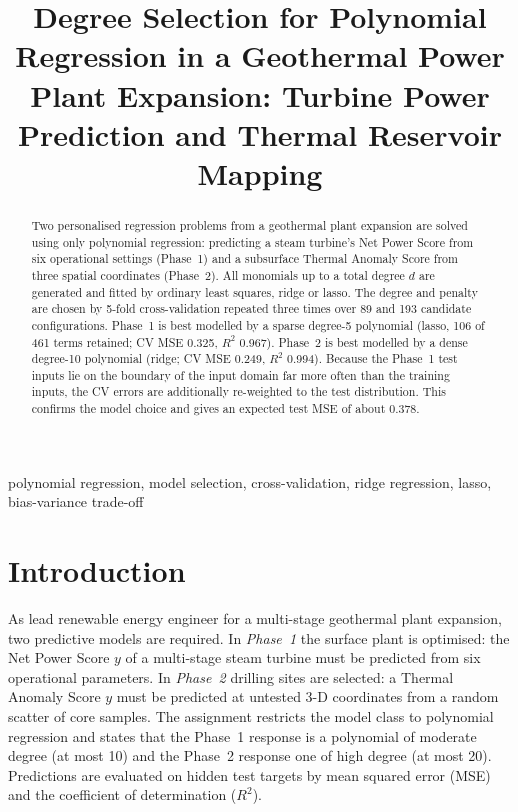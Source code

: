 \documentclass[conference]{IEEEtran}
\begin{document}
\title{Degree Selection for Polynomial Regression in a Geothermal Power Plant Expansion: Turbine Power Prediction and Thermal Reservoir Mapping}

\author{
}

\maketitle

\begin{abstract}
Two personalised regression problems from a geothermal plant expansion are solved using only polynomial regression: predicting a steam turbine's Net Power Score from six operational settings (Phase~1) and a subsurface Thermal Anomaly Score from three spatial coordinates (Phase~2). All monomials up to a total degree $d$ are generated and fitted by ordinary least squares, ridge or lasso. The degree and penalty are chosen by 5-fold cross-validation repeated three times over 89 and 193 candidate configurations. Phase~1 is best modelled by a sparse degree-5 polynomial (lasso, 106 of 461 terms retained; CV MSE 0.325, $R^2$ 0.967). Phase~2 is best modelled by a dense degree-10 polynomial (ridge; CV MSE 0.249, $R^2$ 0.994). Because the Phase~1 test inputs lie on the boundary of the input domain far more often than the training inputs, the CV errors are additionally re-weighted to the test distribution. This confirms the model choice and gives an expected test MSE of about 0.378.
\end{abstract}

\begin{IEEEkeywords}
polynomial regression, model selection, cross-validation, ridge regression, lasso, bias-variance trade-off
\end{IEEEkeywords}

\section{Introduction}
As lead renewable energy engineer for a multi-stage geothermal plant expansion, two predictive models are required. In \emph{Phase~1} the surface plant is optimised: the Net Power Score $y$ of a multi-stage steam turbine must be predicted from six operational parameters. In \emph{Phase~2} drilling sites are selected: a Thermal Anomaly Score $y$ must be predicted at untested 3-D coordinates from a random scatter of core samples. The assignment restricts the model class to polynomial regression and states that the Phase~1 response is a polynomial of moderate degree (at most 10) and the Phase~2 response one of high degree (at most 20). Predictions are evaluated on hidden test targets by mean squared error (MSE) and the coefficient of determination ($R^2$).
\end{document}
